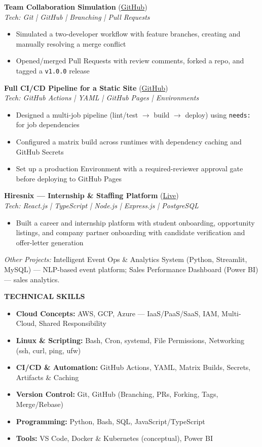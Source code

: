 \documentclass[12pt]{extarticle}
\newcommand{\sectiontitle}[1]{%
  \vspace{0.08em}
  \noindent\colorbox{sectiongray}{\parbox{\dimexpr\textwidth-2\fboxsep}{\textbf{#1}}}
  \vspace{0.05em}
}
\begin{document}
\textbf{Team Collaboration Simulation} (\href{https://github.com/AmarBorse}{GitHub})\\
\textit{Tech: Git | GitHub | Branching | Pull Requests}
\begin{itemize}
    \item Simulated a two-developer workflow with feature branches, creating and manually resolving a merge conflict
    \item Opened/merged Pull Requests with review comments, forked a repo, and tagged a \texttt{v1.0.0} release
\end{itemize}

\textbf{Full CI/CD Pipeline for a Static Site} (\href{https://github.com/AmarBorse}{GitHub})\\
\textit{Tech: GitHub Actions | YAML | GitHub Pages | Environments}
\begin{itemize}
    \item Designed a multi-job pipeline (lint/test \(\rightarrow\) build \(\rightarrow\) deploy) using \texttt{needs:} for job dependencies
    \item Configured a matrix build across runtimes with dependency caching and GitHub Secrets
    \item Set up a production Environment with a required-reviewer approval gate before deploying to GitHub Pages
\end{itemize}

\textbf{Hiresnix --- Internship \& Staffing Platform} (\href{https://www.hiresnix.co.in}{Live})\\
\textit{Tech: React.js | TypeScript | Node.js | Express.js | PostgreSQL}
\begin{itemize}
    \item Built a career and internship platform with student onboarding, opportunity listings, and company partner onboarding with candidate verification and offer-letter generation
\end{itemize}

\textit{Other Projects:} Intelligent Event Ops \& Analytics System (Python, Streamlit, MySQL) --- NLP-based event platform; Sales Performance Dashboard (Power BI) --- sales analytics.

\sectiontitle{TECHNICAL SKILLS}

\begin{itemize}
    \item \textbf{Cloud Concepts:} AWS, GCP, Azure --- IaaS/PaaS/SaaS, IAM, Multi-Cloud, Shared Responsibility
    \item \textbf{Linux \& Scripting:} Bash, Cron, systemd, File Permissions, Networking (ssh, curl, ping, ufw)
    \item \textbf{CI/CD \& Automation:} GitHub Actions, YAML, Matrix Builds, Secrets, Artifacts \& Caching
    \item \textbf{Version Control:} Git, GitHub (Branching, PRs, Forking, Tags, Merge/Rebase)
    \item \textbf{Programming:} Python, Bash, SQL, JavaScript/TypeScript
    \item \textbf{Tools:} VS Code, Docker \& Kubernetes (conceptual), Power BI
\end{itemize}
\end{document}
